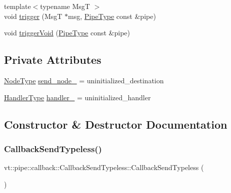 \begin{DoxyCompactItemize}
\item 
{\footnotesize template$<$typename MsgT $>$ }\\void \hyperlink{structvt_1_1pipe_1_1callback_1_1_callback_send_typeless_a7ac1bbf4f30ac7f3c2b80bbef4f55b9d}{trigger} (MsgT $\ast$msg, \hyperlink{namespacevt_ac9852acda74d1896f48f406cd72c7bd3}{Pipe\+Type} const \&pipe)
\item 
void \hyperlink{structvt_1_1pipe_1_1callback_1_1_callback_send_typeless_a014cf2e253661c7490c9ba81c92d0055}{trigger\+Void} (\hyperlink{namespacevt_ac9852acda74d1896f48f406cd72c7bd3}{Pipe\+Type} const \&pipe)
\end{DoxyCompactItemize}
\subsection*{Private Attributes}
\begin{DoxyCompactItemize}
\item 
\hyperlink{namespacevt_a866da9d0efc19c0a1ce79e9e492f47e2}{Node\+Type} \hyperlink{structvt_1_1pipe_1_1callback_1_1_callback_send_typeless_a428997de5158e004e3f4c02effb5584a}{send\+\_\+node\+\_\+} = uninitialized\+\_\+destination
\item 
\hyperlink{namespacevt_af64846b57dfcaf104da3ef6967917573}{Handler\+Type} \hyperlink{structvt_1_1pipe_1_1callback_1_1_callback_send_typeless_a255b0aa7be25b68982a699e3e60ba40e}{handler\+\_\+} = uninitialized\+\_\+handler
\end{DoxyCompactItemize}


\subsection{Constructor \& Destructor Documentation}
\mbox{\label{structvt_1_1pipe_1_1callback_1_1_callback_send_typeless_a23a6190d53f6eeb5e76ddce13fe64180}} 
\subsubsection{\texorpdfstring{Callback\+Send\+Typeless()}{CallbackSendTypeless()}\hspace{0.1cm}{\footnotesize\ttfamily [1/4]}}
{\footnotesize\ttfamily vt\+::pipe\+::callback\+::\+Callback\+Send\+Typeless\+::\+Callback\+Send\+Typeless (\begin{DoxyParamCaption}{ }\end{DoxyParamCaption})\hspace{0.3cm}{\ttfamily [default]}}

